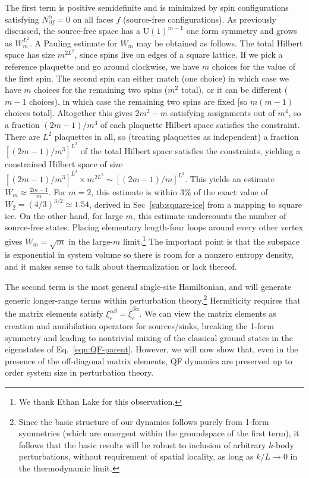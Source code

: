 The first term is positive semidefinite and is minimized by spin configurations satisfying $N^{\alpha}_{\partial f} = 0$ on all faces $f$ (source-free configurations). As previously discussed, the source-free space has a $\text{U}(1)^{m-1}$ one form symmetry and grows as $W_m^{L^2}$. 
A Pauling estimate for $W_m$ may be obtained as follows. The total Hilbert space has size $m^{2L^2}$, since spins live on edges of a square lattice. If we pick a reference plaquette and go around clockwise, we have $m$ choices for the value of the first spin. The second spin can either match (one choice) in which case we have $m$ choices for the remaining two spins ($m^2$ total), or it can be different ($m-1$ choices), in which case the remaining two spins are fixed [so $m(m-1)$ choices total]. Altogether this gives $2m^2 - m$ satisfying assignments out of $m^4$, so a fraction $(2m-1)/m^3$ of each plaquette Hilbert space satisfies the constraint. There are $L^2$ plaquettes in all, so (treating plaquettes as independent) a fraction $[(2m-1)/m^3]^{L^2}$ of the total Hilbert space satisfies the constraints, yielding a constrained Hilbert space of size $[(2m-1)/m^3]^{L^2} \times m^{2L^2} \sim [(2m-1)/m]^{L^2}$. This yields an estimate $W_m \approx \frac{2m-1}{m}$. For $m=2$, this estimate is within $3\%$ of the exact value of
$W_2 = (4/3)^{3/2} \simeq 1.54$, derived in Sec~\ref{sub:square-ice} from a mapping to square ice. On the other hand, for large $m$, this estimate undercounts the number of source-free states. Placing elementary length-four loops around every other vertex gives $W_m = \sqrt{m}$ in the large-$m$ limit.\footnote{We thank Ethan Lake for this observation.} The important point is that the subspace is exponential in system volume so there is room for a nonzero entropy density, and it makes sense to talk about thermalization or lack thereof.

The second term is the most general single-site Hamiltonian, and will generate generic longer-range terms within perturbation theory.\footnote{{Since the basic structure of our dynamics follows purely from 1-form symmetries (which are emergent within the groundspace of the first term), it follows that the basic results will be robust to inclusion of arbitrary $k$-body perturbations, without requirement of spatial locality, as long as $k/L \rightarrow 0$ in the thermodynamic limit.}} Hermiticity requires that the matrix elements satisfy $\xi_e^{\alpha\beta} = \bar{\xi}_e^{\beta\alpha}$. We can view the matrix elements as creation and annihilation operators for sources/sinks, breaking the 1-form symmetry and leading to nontrivial mixing of the classical ground states in the eigenstates of Eq.~\eqref{eqn:QF-parent}.
However, we will now show that, even in the presence of the off-diagonal matrix elements, QF dynamics are preserved up to order system size in perturbation theory.

